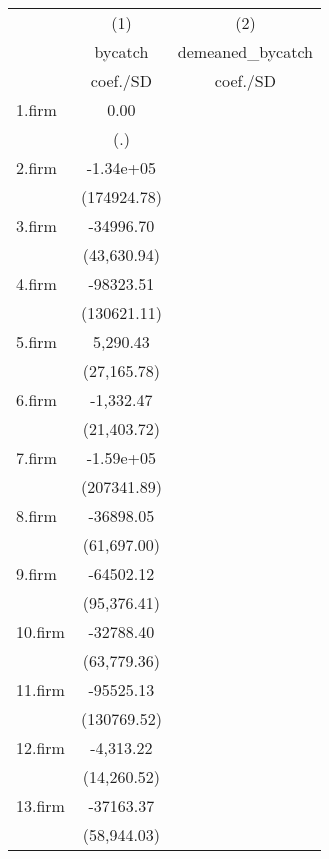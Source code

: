 {
\def\sym#1{\ifmmode^{#1}\else\(^{#1}\)\fi}
\begin{tabular}{l*{2}{c}}
\hline\hline
            &\multicolumn{1}{c}{(1)}&\multicolumn{1}{c}{(2)}\\
            &\multicolumn{1}{c}{bycatch}&\multicolumn{1}{c}{demeaned\_bycatch}\\
            &    coef./SD  &    coef./SD  \\
\hline
1.firm      &        0.00  &              \\
            &         (.)  &              \\
2.firm      &   -1.34e+05  &              \\
            & (174924.78)  &              \\
3.firm      &   -34996.70  &              \\
            & (43,630.94)  &              \\
4.firm      &   -98323.51  &              \\
            & (130621.11)  &              \\
5.firm      &    5,290.43  &              \\
            & (27,165.78)  &              \\
6.firm      &   -1,332.47  &              \\
            & (21,403.72)  &              \\
7.firm      &   -1.59e+05  &              \\
            & (207341.89)  &              \\
8.firm      &   -36898.05  &              \\
            & (61,697.00)  &              \\
9.firm      &   -64502.12  &              \\
            & (95,376.41)  &              \\
10.firm     &   -32788.40  &              \\
            & (63,779.36)  &              \\
11.firm     &   -95525.13  &              \\
            & (130769.52)  &              \\
12.firm     &   -4,313.22  &              \\
            & (14,260.52)  &              \\
13.firm     &   -37163.37  &              \\
            & (58,944.03)  &              \\

\end{tabular}}

